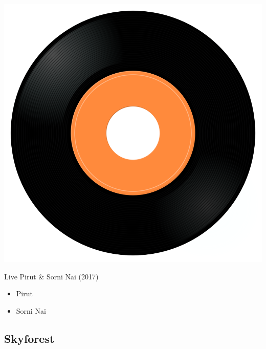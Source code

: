 \begin{minipage}[t]{0.25\textwidth}
\captionsetup{type=figure}
\includegraphics[width=\textwidth]{Images/cover.png}
\caption*{Live Pirut \& Sorni Nai (2017)}
\end{minipage}
\begin{minipage}[t]{0.25\textwidth}\vspace{0pt}
\begin{itemize}[nosep,leftmargin=1em,labelwidth=*,align=left]
	\setlength{\itemsep}{0pt}
	\item Pirut
	\item Sorni Nai
\end{itemize}
\end{minipage}

\subsection{Skyforest}

